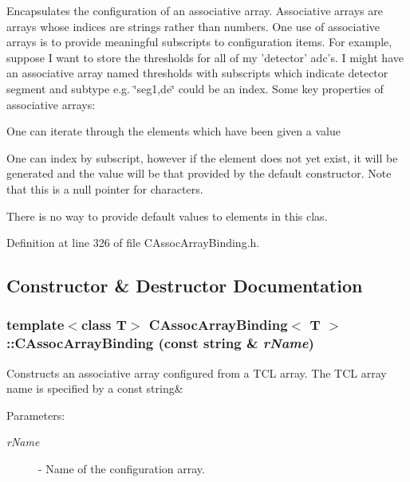 Encapsulates the configuration of an associative array. Associative arrays are arrays whose indices are strings rather than numbers. One use of associative arrays is to provide meaningful subscripts to configuration items. For example, suppose I want to store the thresholds for all of my 'detector' adc's. I might have an associative array named thresholds with subscripts which indicate detector segment and  subtype e.g. \char`\"{}seg1,de\char`\"{} could be an index. Some key properties of  associative arrays:\begin{CompactItemize}
\item 
One can iterate through the elements which have been given a value\item 
One can index by subscript, however if the element does not yet exist, it will be generated and the value will be that provided by the default constructor. Note that this is a null pointer for characters.\item 
There is no way to provide default values to elements in this clas. \end{CompactItemize}




Definition at line 326 of file CAssoc\-Array\-Binding.h.

\subsection{Constructor \& Destructor Documentation}
\subsubsection{\setlength{\rightskip}{0pt plus 5cm}template$<$class T$>$ CAssoc\-Array\-Binding$<$ T $>$::CAssoc\-Array\-Binding (const string \& {\em r\-Name})}\label{classCAssocArrayBinding_a0}


Constructs an associative array configured from a TCL array. The TCL array name is specified by a const string\& \begin{Desc}
\item[Parameters: ]\par
\begin{description}
\item[{\em 
r\-Name}]- Name of the configuration array. \end{description}
\end{Desc}



